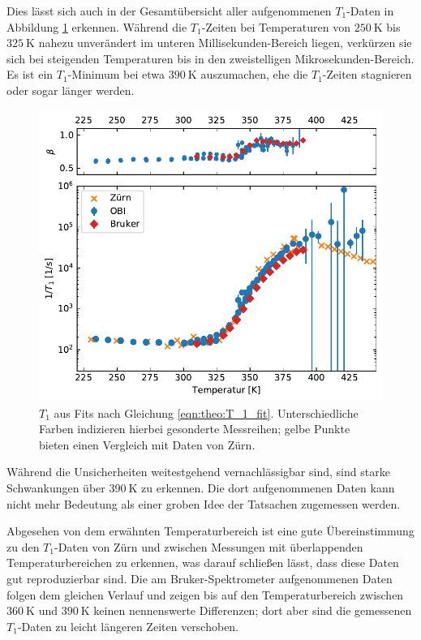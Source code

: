 Dies lässt sich auch in der Gesamtübersicht aller aufgenommenen $T_1$-Daten in Abbildung \ref{fig:res:T_1} erkennen. Während die $T_1$-Zeiten bei Temperaturen von $\SI{250}{\kelvin}$ bis $\SI{325}{\kelvin}$ nahezu unverändert im unteren Millisekunden-Bereich liegen, verkürzen sie sich bei steigenden Temperaturen bis in den zweistelligen Mikrosekunden-Bereich. Es ist ein $T_1$-Minimum bei etwa $\SI{390}{\kelvin}$ auszumachen, ehe die $T_1$-Zeiten stagnieren oder sogar länger werden.
\begin{figure}
	\begin{center}
		\includegraphics[width=\textwidth]{graphics/plot/t1.pdf}
	\end{center}
	\caption{$T_1$ aus Fits nach Gleichung \eqref{eqn:theo:T_1_fit}. Unterschiedliche Farben indizieren hierbei gesonderte Messreihen; gelbe Punkte bieten einen Vergleich mit Daten von Zürn.} \label{fig:res:T_1}
\end{figure}
Während die Unsicherheiten weitestgehend vernachlässigbar sind, sind starke Schwankungen über $\SI{390}{\kelvin}$ zu erkennen. Die dort aufgenommenen Daten kann nicht mehr Bedeutung als einer groben Idee der Tatsachen zugemessen werden.

Abgesehen von dem erwähnten Temperaturbereich ist eine gute Übereinstimmung zu den $T_1$-Daten von Zürn \cite{zuern_paper} und zwischen Messungen mit überlappenden Temperaturbereichen zu erkennen, was darauf schließen lässt, dass diese Daten gut reproduzierbar sind. Die am Bruker-Spektrometer aufgenommenen Daten folgen dem gleichen Verlauf und zeigen bis auf den Temperaturbereich zwischen $\SI{360}{\kelvin}$ und $\SI{390}{\kelvin}$ keinen nennenswerte Differenzen; dort aber sind die gemessenen $T_1$-Daten zu leicht längeren Zeiten verschoben.

